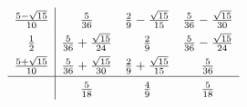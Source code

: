 \begin{gather*}
  \def\arraystretch{1.5}
  \begin{array}{c|ccc}
    \frac{5-\sqrt{15}}{10}
    & \frac{5}{36}
    & \frac29 - \frac{\sqrt{15}}{15}
    & \frac{5}{36} - \frac{\sqrt{15}}{30}
    \\
    \frac12
    & \frac{5}{36} + \frac{\sqrt{15}}{24}
    & \frac29
    & \frac{5}{36} - \frac{\sqrt{15}}{24}
    \\
    \frac{5+\sqrt{15}}{10}
    & \frac{5}{36} + \frac{\sqrt{15}}{30}
    & \frac29 + \frac{\sqrt{15}}{15}
    & \frac{5}{36}
    \\\hline
    & \frac{5}{18} & \frac49 & \frac{5}{18}
  \end{array}  
\end{gather*}

